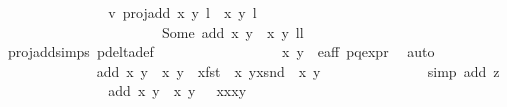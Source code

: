\begin{isabellebody}
\ \ \ \ \ \ \ \ \ \ \ \ \isamarkupfalse%
\ \isamarkupfalse%
\ v{}{\isacharcolon}\ {\isachardoublequoteopen}proj{\isacharunderscore}add\ {\isacharparenleft}{\isacharparenleft}x{\isacharcomma}\ y{\isacharparenright}{\isacharcomma}\ l{\isacharparenright}\ {\isacharparenleft}{\isasymtau}\ {\isacharparenleft}x{\isacharprime}{\isacharcomma}\ y{\isacharprime}{\isacharparenright}{\isacharcomma}\ l{\isacharprime}\ {\isacharplus}\ {}{\isacharparenright}\ {\isacharequal}\ \isanewline
\ \ \ \ \ \ \ \ \ \ \ \ \ \ \ \ \ \ \ \ \ \ \ Some\ {\isacharparenleft}add\ {\isacharparenleft}x{\isacharcomma}\ y{\isacharparenright}\ {\isacharparenleft}{\isasymtau}\ {\isacharparenleft}x{\isacharprime}{\isacharcomma}\ y{\isacharprime}{\isacharparenright}{\isacharparenright}{\isacharcomma}\ l{\isacharplus}l{\isacharprime}{\isacharplus}{}{\isacharparenright}{\isachardoublequoteclose}\isanewline
\ \ \ \ \ \ \ \ \ \ \ \ \ \ \isamarkupfalse%
\ proj{\isacharunderscore}add{\isachardot}simps\ p{\isacharunderscore}delta{\isacharunderscore}def\ \isanewline
\ \ \ \ \ \ \ \ \ \ \ \ \ \ \isamarkupfalse%
\ {\isacartoucheopen}{\isasymtau}\ {\isacharparenleft}x{\isacharprime}{\isacharcomma}\ y{\isacharprime}{\isacharparenright}\ {\isasymin}\ e{\isacharunderscore}aff{\isacartoucheclose}\ p{\isacharunderscore}q{\isacharunderscore}expr{\isacharparenleft}{}{\isacharparenright}\ \isamarkupfalse%
\ auto\ \isanewline
\ \ \ \ \ \ \ \ \ \ \ \ \isamarkupfalse%
\ {\isachardoublequoteopen}add\ {\isacharparenleft}x{\isacharcomma}\ y{\isacharparenright}\ {\isacharparenleft}{\isasymtau}\ {\isacharparenleft}x{\isacharprime}{\isacharcomma}\ y{\isacharprime}{\isacharparenright}{\isacharparenright}\ {\isacharequal}\ {\isacharparenleft}x{\isacharasterisk}{\isacharparenleft}fst\ {\isacharparenleft}{\isasymtau}\ {\isacharparenleft}x{\isacharprime}{\isacharcomma}\ y{\isacharprime}{\isacharparenright}{\isacharparenright}{\isacharparenright}{\isacharcomma}x{\isacharasterisk}{\isacharparenleft}snd\ {\isacharparenleft}{\isasymtau}\ {\isacharparenleft}x{\isacharprime}{\isacharcomma}\ y{\isacharprime}{\isacharparenright}{\isacharparenright}{\isacharparenright}{\isacharparenright}{\isachardoublequoteclose}\isanewline
\ \ \ \ \ \ \ \ \ \ \ \ \ \ \isamarkupfalse%
{\isacharparenleft}simp\ add{\isacharcolon}\ z{}{\isacharparenright}\isanewline
\ \ \ \ \ \ \ \ \ \ \ \ \isamarkupfalse%
\ \isamarkupfalse%
\ {\isachardoublequoteopen}add\ {\isacharparenleft}x{\isacharcomma}\ y{\isacharparenright}\ {\isacharparenleft}{\isasymtau}\ {\isacharparenleft}x{\isacharprime}{\isacharcomma}\ y{\isacharprime}{\isacharparenright}{\isacharparenright}\ {\isacharequal}\ {\isasymtau}\ {\isacharparenleft}x{\isacharasterisk}x{\isacharprime}{\isacharcomma}x{\isacharasterisk}y{\isacharprime}{\isacharparenright}{\isachardoublequoteclose}\isanewline

\end{isabellebody}
